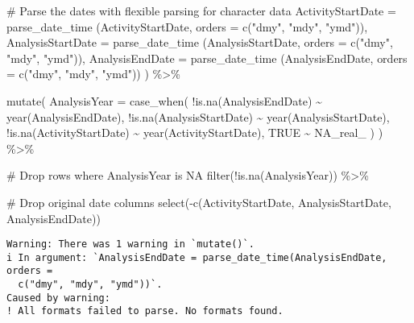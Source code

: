 \documentclass[
  12pt,
]{article}
\newenvironment{Shaded}{\begin{snugshade}}{\end{snugshade}}
\newcommand{\AttributeTok}[1]{\textcolor[rgb]{0.40,0.45,0.13}{#1}}
\newcommand{\CommentTok}[1]{\textcolor[rgb]{0.37,0.37,0.37}{#1}}
\newcommand{\ConstantTok}[1]{\textcolor[rgb]{0.56,0.35,0.01}{#1}}
\newcommand{\FunctionTok}[1]{\textcolor[rgb]{0.28,0.35,0.67}{#1}}
\newcommand{\NormalTok}[1]{\textcolor[rgb]{0.00,0.23,0.31}{#1}}
\newcommand{\SpecialCharTok}[1]{\textcolor[rgb]{0.37,0.37,0.37}{#1}}
\newcommand{\StringTok}[1]{\textcolor[rgb]{0.13,0.47,0.30}{#1}}
\begin{document}
\begin{Shaded}
\begin{Highlighting}[]
    \CommentTok{\# Parse the dates with flexible parsing for character data}
    \AttributeTok{ActivityStartDate =}\NormalTok{ parse\_date\_time}
\NormalTok{    (ActivityStartDate, }\AttributeTok{orders =} \FunctionTok{c}\NormalTok{(}\StringTok{"dmy"}\NormalTok{, }\StringTok{"mdy"}\NormalTok{, }\StringTok{"ymd"}\NormalTok{)),}
    \AttributeTok{AnalysisStartDate =}\NormalTok{ parse\_date\_time}
\NormalTok{    (AnalysisStartDate, }\AttributeTok{orders =} \FunctionTok{c}\NormalTok{(}\StringTok{"dmy"}\NormalTok{, }\StringTok{"mdy"}\NormalTok{, }\StringTok{"ymd"}\NormalTok{)),}
    \AttributeTok{AnalysisEndDate =}\NormalTok{ parse\_date\_time}
\NormalTok{    (AnalysisEndDate, }\AttributeTok{orders =} \FunctionTok{c}\NormalTok{(}\StringTok{"dmy"}\NormalTok{, }\StringTok{"mdy"}\NormalTok{, }\StringTok{"ymd"}\NormalTok{))}
\NormalTok{  ) }\SpecialCharTok{\%\textgreater{}\%}
  
  \FunctionTok{mutate}\NormalTok{(}
    \AttributeTok{AnalysisYear =} \FunctionTok{case\_when}\NormalTok{(}
      \SpecialCharTok{!}\FunctionTok{is.na}\NormalTok{(AnalysisEndDate) }\SpecialCharTok{\textasciitilde{}} \FunctionTok{year}\NormalTok{(AnalysisEndDate),}
      \SpecialCharTok{!}\FunctionTok{is.na}\NormalTok{(AnalysisStartDate) }\SpecialCharTok{\textasciitilde{}} \FunctionTok{year}\NormalTok{(AnalysisStartDate),}
      \SpecialCharTok{!}\FunctionTok{is.na}\NormalTok{(ActivityStartDate) }\SpecialCharTok{\textasciitilde{}} \FunctionTok{year}\NormalTok{(ActivityStartDate),}
      \ConstantTok{TRUE} \SpecialCharTok{\textasciitilde{}} \ConstantTok{NA\_real\_}
\NormalTok{    )}
\NormalTok{  ) }\SpecialCharTok{\%\textgreater{}\%}
  
  \CommentTok{\# Drop rows where AnalysisYear is NA}
  \FunctionTok{filter}\NormalTok{(}\SpecialCharTok{!}\FunctionTok{is.na}\NormalTok{(AnalysisYear)) }\SpecialCharTok{\%\textgreater{}\%}
  
  \CommentTok{\# Drop original date columns}
  \FunctionTok{select}\NormalTok{(}\SpecialCharTok{{-}}\FunctionTok{c}\NormalTok{(ActivityStartDate, AnalysisStartDate, AnalysisEndDate))}
\end{Highlighting}
\end{Shaded}

\begin{verbatim}
Warning: There was 1 warning in `mutate()`.
i In argument: `AnalysisEndDate = parse_date_time(AnalysisEndDate, orders =
  c("dmy", "mdy", "ymd"))`.
Caused by warning:
! All formats failed to parse. No formats found.
\end{verbatim}
\end{document}
